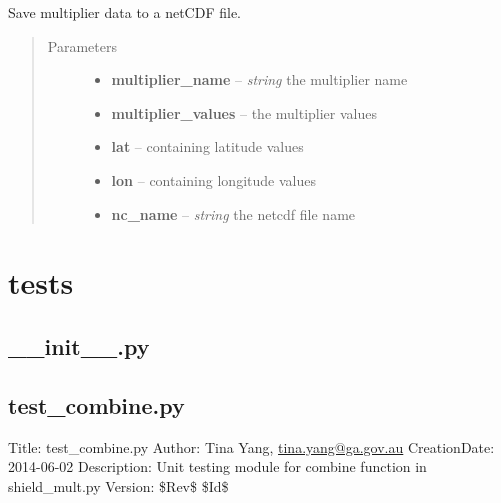 \documentclass[letterpaper,10pt,english]{sphinxmanual}
\begin{document}

\begin{fulllineitems}
\label{docs/utilities:nctools.save_multiplier}
Save multiplier data to a netCDF file.
\begin{quote}\begin{description}
\item[{Parameters}] \leavevmode\begin{itemize}
\item {} 
\textbf{multiplier\_name} -- \emph{string} the multiplier name

\item {} 
\textbf{multiplier\_values} --  the multiplier values

\item {} 
\textbf{lat} --  containing latitude values

\item {} 
\textbf{lon} --  containing longitude values

\item {} 
\textbf{nc\_name} -- \emph{string} the netcdf file name

\end{itemize}

\end{description}\end{quote}

\end{fulllineitems}



\section{tests}
\label{docs/tests:tests}\label{docs/tests::doc}

\subsection{\_\_init\_\_.py}
\label{docs/tests:init-py}\label{docs/tests:module-__init__}

\subsection{test\_combine.py}
\label{docs/tests:module-test_combine}\label{docs/tests:test-combine-py}
Title: test\_combine.py 
Author: Tina Yang, \href{mailto:tina.yang@ga.gov.au}{tina.yang@ga.gov.au} 
CreationDate: 2014-06-02
Description: Unit testing module for combine function in shield\_mult.py 
Version: \$Rev\$ 
\$Id\$
\end{document}
